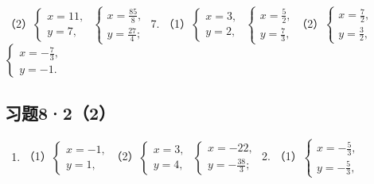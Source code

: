 （2）\(\left\{ \begin{array}{l} x = 11, \\ y = 7, \end{array} \right.\) \(\left\{ \begin{array}{l} x = \frac{85}{8}, \\ y = \frac{27}{4}; \end{array} \right.\)
7.
（1）\(\left\{ \begin{array}{l} x = 3, \\ y = 2, \end{array} \right.\) \(\left\{ \begin{array}{l} x = \frac{5}{2}, \\ y = \frac{7}{3}, \end{array} \right.\)（2）\(\left\{ \begin{array}{l} x = \frac{7}{2}, \\ y = \frac{3}{2}, \end{array} \right.\) \(\left\{ \begin{array}{l} x = -\frac{7}{3}, \\ y = -1. \end{array} \right.\)

\subsection{习题8·2（2）}

\begin{enumerate}
\item
  （1）\(\left\{ \begin{array}{l} x = -1, \\ y = 1, \end{array} \right.\)（2）\(\left\{ \begin{array}{l} x = 3, \\ y = 4, \end{array} \right.\) \(\left\{ \begin{array}{l} x = -22, \\ y = -\frac{38}{3}; \end{array} \right.\)
  2.
  （1）\(\left\{ \begin{array}{l} x = -\frac{5}{3}, \\ y = -\frac{5}{3}, \end{array} \right.\)
\end{enumerate}

